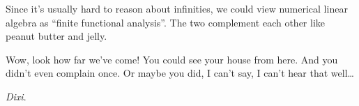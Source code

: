 Since it's usually hard to reason about infinities, we could view
numerical linear algebra as ``finite functional analysis''. The two
complement each other like peanut butter and jelly.

Wow, look how far we've come! You could see your house from here. And
you didn't even complain once. Or maybe you did, I can't say, I can't
hear that well\dots

\vfill\textit{Dixi}.